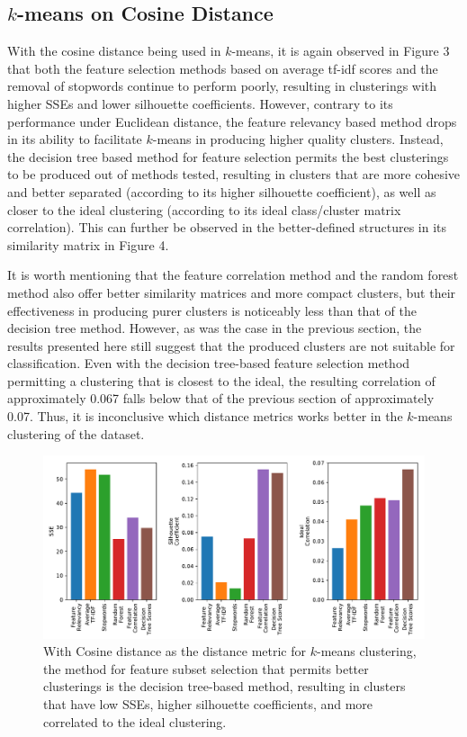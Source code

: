 \documentclass[11pt]{article}
\begin{document}
\subsection{$k$-means on Cosine Distance} \label{sec:cosine}

With the cosine distance being used in $k$-means, it is again observed in Figure 3 that both the feature selection methods based on average tf-idf scores and the removal of stopwords continue to perform poorly, resulting in clusterings with higher SSEs and lower silhouette coefficients.
However, contrary to its performance under Euclidean distance, the feature relevancy based method drops in its ability to facilitate $k$-means in producing higher quality clusters.
Instead, the decision tree based method for feature selection permits the best clusterings to be produced out of methods tested, resulting in clusters that are more cohesive and better separated (according to its higher silhouette coefficient), as well as closer to the ideal clustering (according to its ideal class/cluster matrix correlation).
This can further be observed in the better-defined structures in its similarity matrix in Figure 4.

It is worth mentioning that the feature correlation method and the random forest method also offer better similarity matrices and more compact clusters, but their effectiveness in producing purer clusters is noticeably less than that of the decision tree method.
However, as was the case in the previous section, the results presented here still suggest that the produced clusters are not suitable for classification.
Even with the decision tree-based feature selection method permitting a clustering that is closest to the ideal, the resulting correlation of approximately 0.067 falls below that of the previous section of approximately 0.07.
Thus, it is inconclusive which distance metrics works better in the $k$-means clustering of the dataset.


\begin{figure}[h!] \label{fig:something}
  \centering
  \includegraphics[height=0.27\textheight]{figures/hw3/cosine/feature_subset_selection}
  \caption{With Cosine distance as the distance metric for $k$-means clustering, the method for feature subset selection that permits better clusterings is the decision tree-based method, resulting in clusters that have low SSEs, higher silhouette coefficients, and more correlated to the ideal clustering.}
\end{figure}
\end{document}
